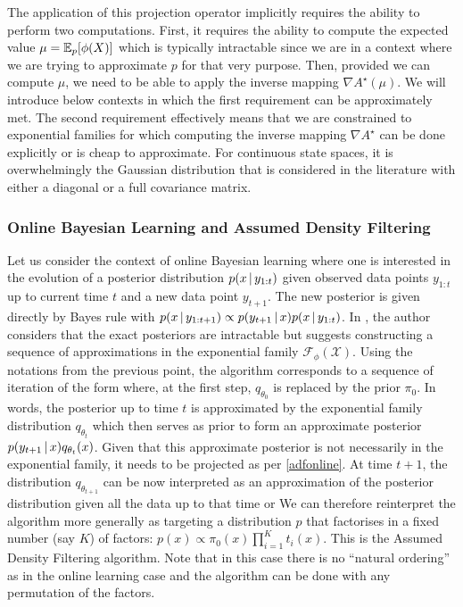 The application of this projection operator implicitly requires the ability to perform two computations. First, it requires the ability to compute the expected value $\mu=\mathbb E_{p}[\phi(X)]$ which is typically intractable since we are in a context where we are trying to approximate $p$ for that very purpose. Then, provided we can compute $\mu$, we need to be able to apply the inverse mapping $\nabla A^{\star}(\mu)$. We will introduce below contexts in which the first requirement can be approximately met. The second requirement effectively means that we are constrained to exponential families for which computing the inverse mapping $\nabla A^{\star}$ can be done explicitly or is cheap to approximate. For continuous state spaces, it is overwhelmingly the Gaussian distribution that is considered in the literature with either a diagonal or a full covariance matrix. 
%
\subsubsection*{Online Bayesian Learning and Assumed Density Filtering}
%
Let us consider the context of online Bayesian learning where one is interested in the evolution of a posterior distribution $p(x\,|\, y_{1:t})$ given observed \iid{} data points $y_{1:t}$ up to current time $t$ and a new \iid data point $y_{t+1}$. The new posterior is given directly by Bayes rule with $p(x\,|\, y_{1:t+1})\propto p(y_{t+1}\,|\, x) p(x\,|\, y_{1:t})$. In \citet{opper98}, the author considers that the exact posteriors are intractable but suggests constructing a sequence of approximations in the exponential family $\mathcal F_{\phi}(\mathcal X)$. Using the notations from the previous point, the algorithm corresponds to a sequence of iteration of the form
where, at the first step, $q_{\theta_{0}}$ is replaced by the prior $\pi_{0}$. In words, the posterior up to time $t$ is approximated by the exponential family distribution $q_{\theta_{t}}$ which then serves as prior to form an approximate posterior $p(y_{t+1}\,|\, x)q_{\theta_{t}}(x)$. Given that this approximate posterior is not necessarily in the exponential family, it needs to be projected as per \eqref{adfonline}. At time $t+1$, the distribution $q_{\theta_{t+1}}$ can be now interpreted as an approximation of the posterior distribution given all the data up to that time or 
%
%
We can therefore reinterpret the algorithm more generally as targeting a distribution $p$ that factorises in a fixed number (say $K$) of factors: $p(x)\propto \pi_{0}(x)\prod_{i=1}^{K}t_{i}(x)$. This is the Assumed Density Filtering algorithm. Note that in this case there is no ``natural ordering'' as in the online learning case and the algorithm can be done with any permutation of the factors.

